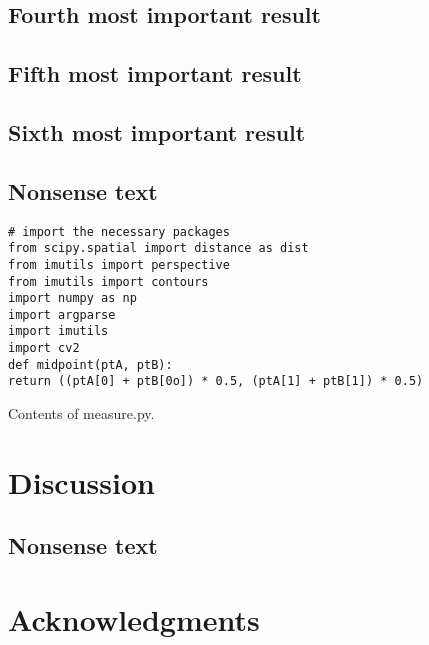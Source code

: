 \documentclass[11pt,letterpaper]{article}
\newenvironment{code}{\captionsetup{type=listing}}{}
\begin{document}
\subsection*{Fourth most important result}
\label{sec:orgb21e5cf}



\subsection*{Fifth most important result}
\label{sec:org9cd4340}



\subsection*{Sixth most important result}
\label{sec:org8ace0bc}

\subsection*{Nonsense text}
\label{sec:org0e4b273}
\lipsum[1-10]

\begin{singlespace}
\begin{code}{}
\label{lst:measureSize}
\begin{verbatim}
# import the necessary packages
from scipy.spatial import distance as dist
from imutils import perspective
from imutils import contours
import numpy as np
import argparse
import imutils
import cv2
def midpoint(ptA, ptB):
return ((ptA[0] + ptB[0o]) * 0.5, (ptA[1] + ptB[1]) * 0.5)
\end{verbatim}
\caption{Contents of measure.py. \label{lst:measureSize}}
\end{code}
\end{singlespace}

\section*{Discussion}
\label{sec:org11bc26e}
\subsection*{Nonsense text}
\label{sec:org5518a2c}
\lipsum[1-10]


\section*{Acknowledgments}
\label{sec:orge820224}
\subsection*{}
\label{sec:org8e47bfd}
\newpage



\subsection*{}
\label{sec:org282371a}
\newpage
\listoftables
\end{document}
